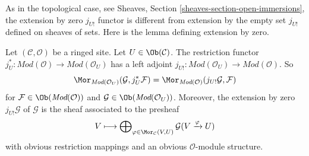 \noindent
As in the topological case, see
Sheaves, Section \ref{sheaves-section-open-immersions},
the extension by zero $j_{U!}$ functor is different from
extension by the empty set $j_{U!}$ defined on sheaves of sets.
Here is the lemma defining extension by zero.

\begin{lemma}
\label{lemma-extension-by-zero}
Let $(\mathcal{C}, \mathcal{O})$ be a ringed site.
Let $U \in \Ob(\mathcal{C})$.
The restriction functor
$j_U^* : \textit{Mod}(\mathcal{O}) \to \textit{Mod}(\mathcal{O}_U)$
has a left adjoint
$j_{U!} : \textit{Mod}(\mathcal{O}_U) \to \textit{Mod}(\mathcal{O})$.
So
$$
\Mor_{\textit{Mod}(\mathcal{O}_U)}(\mathcal{G}, j_U^*\mathcal{F})
=
\Mor_{\textit{Mod}(\mathcal{O})}(j_{U!}\mathcal{G}, \mathcal{F})
$$
for $\mathcal{F} \in \Ob(\textit{Mod}(\mathcal{O}))$
and $\mathcal{G} \in \Ob(\textit{Mod}(\mathcal{O}_U))$.
Moreover, the extension by zero $j_{U!}\mathcal{G}$ of $\mathcal{G}$
is the sheaf associated to the presheaf
$$
V
\longmapsto
\bigoplus\nolimits_{\varphi \in \Mor_\mathcal{C}(V, U)}
\mathcal{G}(V \xrightarrow{\varphi} U)
$$
with obvious restriction mappings and an obvious $\mathcal{O}$-module
structure.
\end{lemma}

